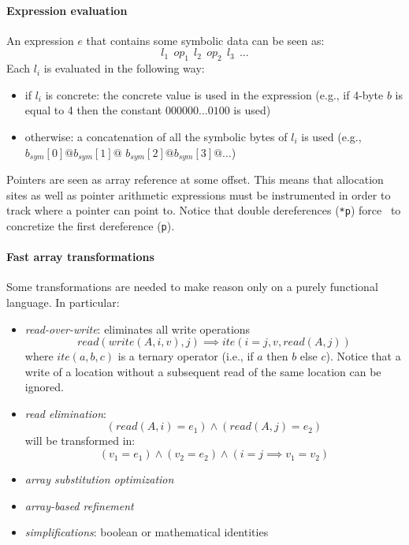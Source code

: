 \paragraph{Expression evaluation} An expression $e$ that contains some symbolic data can be seen as:
\[ l_1~~op_1~~l_2~~op_2~~l_3~~... \]
Each $l_i$ is evaluated in the following way:
\begin{itemize}
  \item if $l_i$ is concrete: the concrete value is used in the expression (e.g., if 4-byte $b$ is equal to 4 then the constant $000000...0100$ is used)
  \item otherwise: a concatenation of all the symbolic bytes of $l_i$ is used (e.g., $b_{sym}[0] @b_{sym}[1] @ $ $b_{sym}[2] @ b_{sym}[3] @ ...$)
\end{itemize}
Pointers are seen as array reference at some offset. This means that allocation sites as well as pointer arithmetic expressions must be instrumented in order to track where a pointer can point to. Notice that double dereferences ({\tt **p}) force~\cite{STP-TR07} to concretize the first dereference ({\tt *p}). 

\paragraph{Fast array transformations} Some transformations are needed to make\cite{STP-TR07} reason only on a purely functional language. In particular:
\begin{itemize}
  \item {\em read-over-write}: eliminates all write operations
    \[ read(write(A, i, v), j) \implies ite(i = j, v, read(A, j)) \]
    where $ite(a,b,c)$ is a ternary operator (i.e., if $a$ then $b$ else $c$). Notice that a write of a location without a subsequent read of the same location can be ignored.
  \item {\em read elimination}:
    \[ (read(A, i) = e_1) \wedge (read(A, j) = e_2) \]
    will be transformed in:
    \[ (v_1 = e_1) \wedge (v_2 = e_2) \wedge (i=j \implies v_1 = v_2) \]
  \item {\em array substitution optimization}
  \item {\em array-based refinement}
  \item {\em simplifications}: boolean or mathematical identities
\end{itemize} 

\fi
